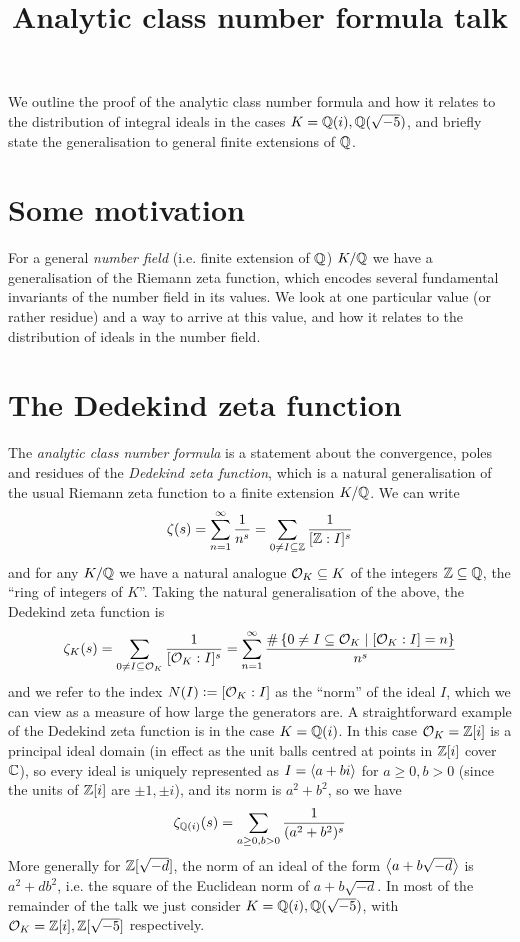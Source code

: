 \documentclass[11pt]{article}
\title{Analytic class number formula talk}
\begin{document}
\maketitle
We outline the proof of the analytic class number formula and how it relates to the distribution of integral ideals in the cases $K = \mathbb{Q}(i), \mathbb{Q}(\sqrt{-5})$, and briefly state the generalisation to general finite extensions of $\mathbb{Q}$.

\section{Some motivation}
For a general \emph{number field} (i.e. finite extension of $\mathbb{Q}$) $K / \mathbb{Q}$ we have a generalisation of the Riemann zeta function, which encodes several fundamental invariants of the number field in its values. We look at one particular value (or rather residue) and a way to arrive at this value, and how it relates to the distribution of ideals in the number field.
\section{The Dedekind zeta function}
The \emph{analytic class number formula} is a statement about the convergence, poles and residues of the \emph{Dedekind zeta function}, which is a natural generalisation of the usual Riemann zeta function to a finite extension $K / \mathbb{Q}$. We can write
$$
    \zeta(s) = \sum_{n = 1}^\infty \frac1{n^s} = \sum_{0 \neq I \subseteq \mathbb{Z}} \frac1{[\mathbb{Z} : I]^s}
$$
and for any $K / \mathbb{Q}$ we have a natural analogue $\mathcal{O}_K \subseteq K$ of the integers $\mathbb{Z} \subseteq \mathbb{Q}$, the ``ring of integers of $K$''. Taking the natural generalisation of the above, the Dedekind zeta function is
$$
    \zeta_K(s) = \sum_{0 \neq I \subseteq \mathcal{O}_K} \frac1{[\mathcal{O}_K : I]^s} = \sum_{n = 1}^\infty \frac{\#\left\{  0 \neq I \subseteq \mathcal{O}_K \mid [\mathcal{O}_K : I] = n  \right\}}{n^s}
$$
and we refer to the index $N(I) \vcentcolon= [\mathcal{O}_K : I]$ as the ``norm'' of the ideal $I$, which we can view as a measure of how large the generators are. A straightforward example of the Dedekind zeta function is in the case $K = \mathbb{Q}(i)$. In this case $\mathcal{O}_K = \mathbb{Z}[i]$ is a principal ideal domain (in effect as the unit balls centred at points in $\mathbb{Z}[i]$ cover $\mathbb{C}$), so every ideal is uniquely represented as $I = \left\langle a + bi \right\rangle$ for $a \geq 0, b > 0$ (since the units of $\mathbb{Z}[i]$ are $\pm 1, \pm i$), and its norm is $a^2 + b^2$, so we have
$$
    \zeta_{\mathbb{Q}(i)}(s) = \sum_{a \geq 0, b > 0} \frac1{(a^2 + b^2)^s}
$$
More generally for $\mathbb{Z}[\sqrt{-d}]$, the norm of an ideal of the form $\left\langle a + b\sqrt{-d} \right\rangle$ is $a^2 + db^2$, i.e. the square of the Euclidean norm of $a + b\sqrt{-d}$. In most of the remainder of the talk we just consider $K = \mathbb{Q}(i), \mathbb{Q}(\sqrt{-5})$, with $\mathcal{O}_K = \mathbb{Z}[i], \mathbb{Z}[\sqrt{-5}]$ respectively.
\end{document}
